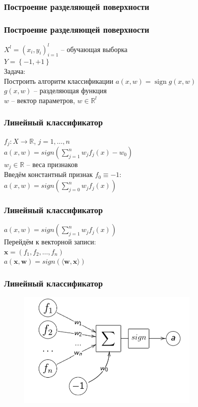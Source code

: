 \documentclass[12pt]{beamer}
\DeclareMathOperator{\sign}{sign}
\begin{document}
\begin{frame}\frametitle{Построение разделяющей поверхности}
\end{frame}


\begin{frame}\frametitle{Построение разделяющей поверхности}
${X^l = (x_i,y_i)_{i = 1}^l}$ -- обучающая выборка\\ 
${Y=\left\{-1,+1\right\}}$\\
\vspace{5mm}
Задача:\\
Построить алгоритм классификации ${a(x,w) = \sign g(x,w)}$\\\vspace{5mm}
${g(x,w)}$ -- разделяющая функция\\
$w$ -- вектор параметров, $w \in \mathbb{R}^l$
\end{frame}


\begin{frame}\frametitle{Линейный классификатор}
$f_j: X \rightarrow \mathbb{R}$, $j = 1,\dots, n$\\
\vspace{3mm}
$a(x, w) = sign(\sum\limits_{j=1}^n w_jf_j(x) - w_0)$\\
$w_j \in \mathbb{R}$ -- веса признаков\\
\vspace{7mm}
Введём константный признак $f_0 \equiv -1$:\\
$a(x, w) = sign(\sum\limits_{j=0}^n w_jf_j(x))$\\
\end{frame}

\begin{frame}\frametitle{Линейный классификатор}
$a(x, w) = sign(\sum\limits_{j=1}^n w_jf_j(x))$\\

\vspace{3mm}
Перейдём к векторной записи:\\
$\mathbf{x} = (f_1, f_2, \dots, f_n)$\\
\vspace{3mm}
$a(\mathbf{x}, \mathbf{w}) = sign(\langle \mathbf{w}, \mathbf{x}\rangle)$\\
\end{frame}


\begin{frame}\frametitle{Линейный классификатор}
\begin{figure}[htbp]
  \includegraphics[height=160pt, keepaspectratio = true]{images/neuron}   
\end{figure}
\end{frame}
\end{document}
